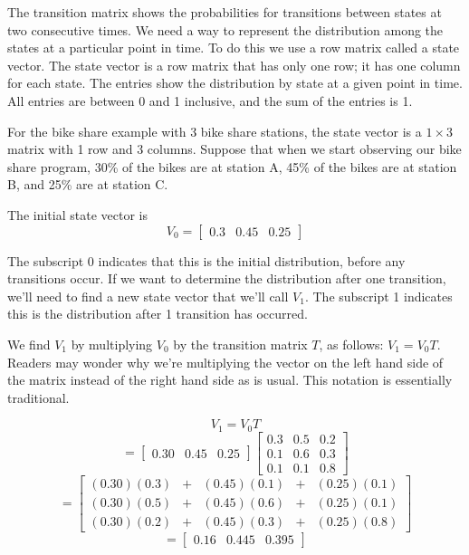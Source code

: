 The transition matrix shows the probabilities for transitions between states at two consecutive times.  We need a way to represent the distribution among the states at a particular point in time. To do this we use a row matrix called a state vector.  The state vector is a row matrix that has only one row; it has one column for each state.  The entries show the distribution by state at a given point in time.  All entries are between 0 and 1 inclusive, and the sum of the entries is 1.

For the bike share example with 3 bike share stations, the state vector is a $1\times3$ matrix with
1 row and 3 columns.  Suppose that when we start observing our bike share program,
30\% of the bikes are at station A, 45\% of the bikes are at station B, and 25\% are at station C.

The initial state vector is
\[
    V_0 = \begin{bmatrix}
        0.3 & 0.45 & 0.25
    \end{bmatrix}
\]

The subscript 0 indicates that this is the initial distribution, before any transitions occur.
If we want to determine the distribution after one transition, we’ll need to find a new state vector that we’ll call $V_1$.  The subscript 1 indicates this is the distribution after 1 transition has occurred.

We find $V_1$ by multiplying $V_0$ by the transition matrix $T$, as follows:
$V_1= V_0T $. Readers may wonder why we're multiplying the vector on the left hand side of the matrix instead of the right hand side as is usual. This notation is essentially traditional.

\[
    V_{1} = V_{0}T
\]
\[
    = \begin{bmatrix}
        0.30 & 0.45 & 0.25
    \end{bmatrix}
    \begin{bmatrix}
        0.3 & 0.5 & 0.2 \\
        0.1 & 0.6 & 0.3 \\
        0.1 & 0.1 & 0.8
    \end{bmatrix}
\]
\[
    = \begin{bmatrix}
        (0.30)(0.3) & + & (0.45)(0.1) & + & (0.25)(0.1) \\
        (0.30)(0.5) & + & (0.45)(0.6) & + & (0.25)(0.1) \\
        (0.30)(0.2) & + & (0.45)(0.3) & + & (0.25)(0.8)
    \end{bmatrix}
\]
\[
    = \begin{bmatrix}
        0.16 & 0.445 & 0.395
    \end{bmatrix}
\]

